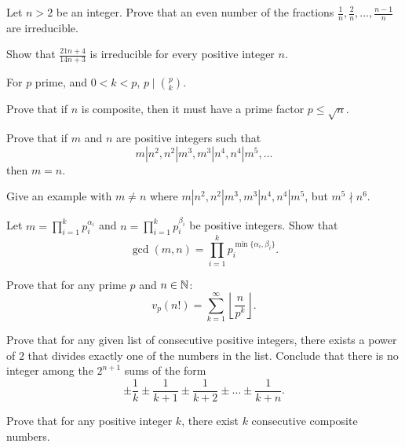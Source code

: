 \documentclass[12pt]{memoir}
\begin{document}
\begin{Ej}
Let \(n > 2\) be an integer. Prove that an even number of the fractions \(\frac{1}{n}, \frac{2}{n}, \dots, \frac{n-1}{n}\) are irreducible.
\end{Ej}

\begin{Ej}
Show that \(\frac{21n + 4}{14n + 3}\) is irreducible for every positive integer \(n\).
\end{Ej}

\begin{Ej}
    For \(p\) prime, and \(0<k<p\), \(p\mid\binom{p}{k}\).
\end{Ej}

\begin{Ej}
Prove that if \(n\) is composite, then it must have a prime factor \(p \leq \sqrt{n}\).
\end{Ej}

\begin{Ej}
Prove that if \(m\) and \(n\) are positive integers such that 
\[
m|n^2, n^2|m^3, m^3|n^4, n^4|m^5, \dots
\]
then \(m = n\).\par
Give an example with \(m \neq n\) where \(m|n^2, n^2|m^3, m^3|n^4, n^4|m^5\), but \(m^5 \nmid n^6\).
\end{Ej}

\begin{Ej}
Let \(m = \prod_{i=1}^k p_i^{\alpha_i}\) and \(n = \prod_{i=1}^k p_i^{\beta_i}\) be positive integers. Show that 
\[
\gcd(m, n) = \prod_{i=1}^k p_i^{\min\{\alpha_i, \beta_i\}}.
\]
\end{Ej}

\begin{Ej}
Prove that for any prime \(p\) and \(n \in \mathbb{N}\):
\[
    v_p(n!) = \sum_{k=1}^{\infty} \left\lfloor \frac{n}{p^k} \right\rfloor.
\]
\end{Ej}

\begin{Ej}
Prove that for any given list of consecutive positive integers, there exists a power of \(2\) that divides exactly one of the numbers in the list. Conclude that there is no integer among the \(2^{n+1}\) sums of the form
\[
    \pm \frac{1}{k} \pm \frac{1}{k+1} \pm \frac{1}{k+2} \pm \dots \pm \frac{1}{k+n}.
\]
\end{Ej}

\begin{Ej}
Prove that for any positive integer \(k\), there exist \(k\) consecutive composite numbers.
\end{Ej}
\end{document}
